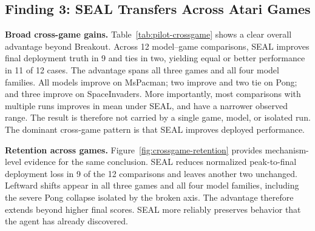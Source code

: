 \documentclass[letterpaper]{article} \usepackage{aaai2027}  \usepackage[hyphens]{url}  \usepackage{graphicx} \urlstyle{rm} \def\UrlFont{\rm}  \usepackage{natbib}  \usepackage{caption} \usepackage{amsfonts} \usepackage{multirow} \frenchspacing  \usepackage{algorithm}
\newcommand{\method}{SEAL}
\begin{document}
\subsection{Finding 3: SEAL Transfers Across Atari Games}
\textbf{Broad cross-game gains.}
Table~\ref{tab:pilot-crossgame} shows a clear overall advantage beyond Breakout. Across 12 model--game comparisons, \method{} improves final deployment truth in 9 and ties in two, yielding equal or better performance in 11 of 12 cases. The advantage spans all three games and all four model families. All models improve on MsPacman; two improve and two tie on Pong; and three improve on SpaceInvaders. 
More importantly, most comparisons with multiple runs improves in mean under \method{}, and have a narrower observed range. 
The result is therefore not carried by a single game, model, or isolated run. The dominant cross-game pattern is that \method{} improves deployed performance.


\textbf{Retention across games.}
Figure~\ref{fig:crossgame-retention} provides mechanism-level evidence for the same conclusion. \method{} reduces normalized peak-to-final deployment loss in 9 of the 12 comparisons and leaves another two unchanged. Leftward shifts appear in all three games and all four model families, including the severe Pong collapse isolated by the broken axis. 
The advantage therefore extends beyond higher final scores.
\method{} more reliably preserves behavior that the agent has already discovered. 
\end{document}
